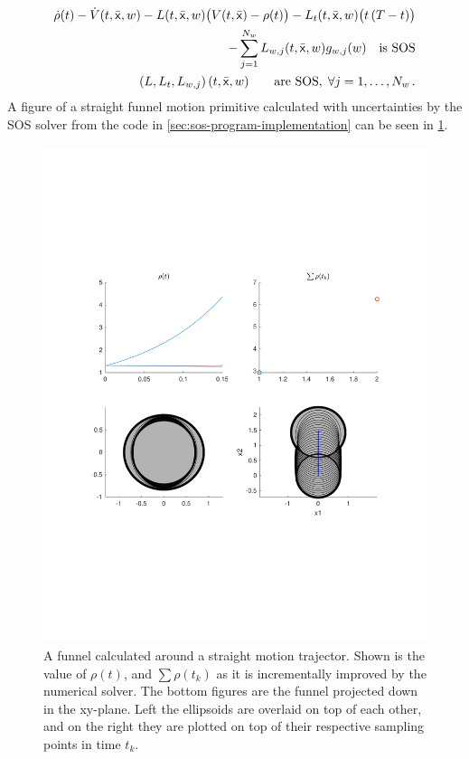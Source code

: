 \begin{align}
  \label{eq:optimizationconditionuncertain}
  \dot{\rho}(t) - \dot{V}(t,\bar{{\mathbf{\mathsf{x}}}},w) - L(t,\bar{{\mathbf{\mathsf{x}}}},w) \bigl( V(t,\bar{{\mathbf{\mathsf{x}}}}) - \rho(t) \bigr) - L_{t}(t,\bar{{\mathbf{\mathsf{x}}}},w) \bigl( t\left( T - t \right) \bigr)  & \nonumber \\
  - \sum_{j=1}^{N_{w}} L_{w,j}(t,\bar{{\mathbf{\mathsf{x}}}},w)g_{w,j}(w) \quad \text{is SOS} &  \\
  \left( L, L_t, L_{w,j} \right) (t,\bar{{\mathbf{\mathsf{x}}}},w) \qquad \text{are SOS}, \; \forall j = 1,\ldots,N_w \, . \nonumber
\end{align}
A figure of a straight funnel motion primitive calculated with uncertainties by
the \ac{SOS} solver from the code in \cref{sec:sos-program-implementation} can
be seen in \cref{fig:funnel-calculation-visuals}.

\begin{figure}
  \centering \includegraphics[scale=.5, trim={0cm 6cm 0cm
    6cm}]{figures/method/funnel-calculation-visuals}
  \caption[A funnel calculated around a straight trajector]{A funnel calculated around a straight motion trajector. Shown is the
    value of \(\rho(t)\), and \(\sum \rho(t_k)\) as it is incrementally improved
    by the numerical solver. The bottom figures are the funnel projected down in
    the xy-plane. Left the ellipsoids are overlaid on top of each other, and on
    the right they are plotted on top of their respective sampling points in
    time \(t_k\).}
  \label{fig:funnel-calculation-visuals}
\end{figure}

